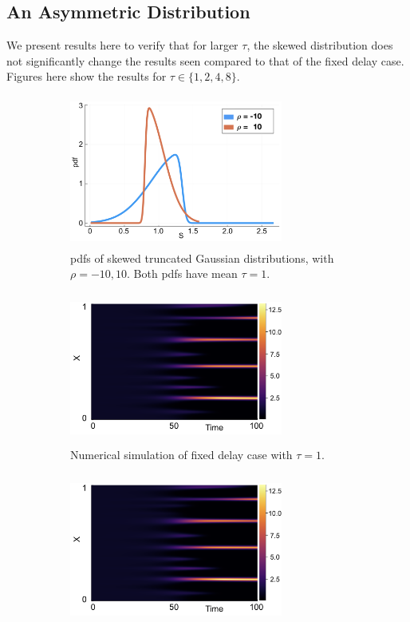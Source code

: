 \subsection{An Asymmetric Distribution}

We present results here to verify that for larger $\tau$, the skewed distribution does not significantly change the results seen compared to that of the fixed delay case. Figures here show the results for $\tau\in\{1,2,4,8\}$.

\begin{figure}[H]
    \centering
    \begin{subfigure}[t]{0.45\textwidth}
        \centering
        \includegraphics[width=7cm,height=5cm]{skewdist1.png}
        \caption{pdfs of skewed truncated Gaussian distributions, with $\rho=-10,10$. Both pdfs have mean $\tau=1$.}
        \label{}
    \end{subfigure}
    \hfill
    \begin{subfigure}[t]{0.45\textwidth}
        \centering
        \includegraphics[width=7cm,height=5cm]{fixt1.png}
        \caption{Numerical simulation of fixed delay case with $\tau=1$.}
        \label{}
    \end{subfigure}
    \hfill
    \begin{subfigure}[t]{0.45\textwidth}
        \centering
        \includegraphics[width=7cm,height=5cm]{fixt1.png}

\end{subfigure}
\end{figure}

